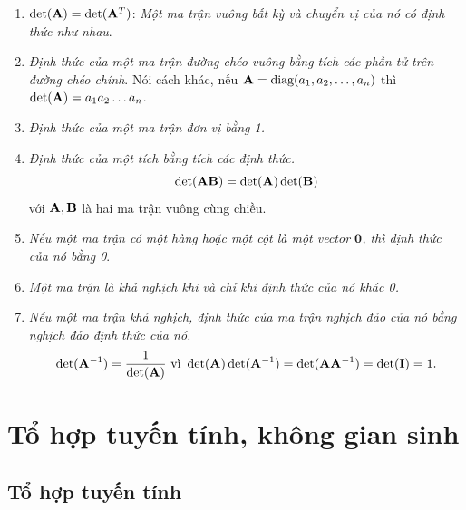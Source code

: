 \begin{enumerate}

\item $\det(\mathbf{A}) = \det(\mathbf{A}^T)$: \textit{Một ma trận vuông bất kỳ và chuyển vị của
nó có định thức như nhau}.

\item \textit{Định thức của một ma trận đường chéo vuông bằng tích các
phần tử trên đường chéo chính}. Nói cách khác, nếu $\mathbf{A} = \text{diag}(a_1, a_2, \dots, a_n)$
thì $\det(\mathbf{A}) = a_1a_2\dots a_n$.

\item \textit{Định thức của một ma trận đơn vị bằng 1.}

\item \textit{Định thức của một tích bằng tích các định thức.}
\begin{equation}
\det(\mathbf{A}\mathbf{B}) = \det(\mathbf{A}) \det(\mathbf{B})
\end{equation}
với $\mathbf{A}, \mathbf{B}$ là hai ma trận vuông cùng chiều.


\item \textit{Nếu một ma trận có một hàng hoặc một cột là một vector
$\mathbf{0}$, thì định thức của nó bằng 0}.


\item \textit{Một ma trận là khả nghịch khi và chỉ khi định thức của nó
khác 0.}


\item \textit{Nếu một ma trận khả nghịch, định thức của ma trận nghịch đảo
của nó bằng nghịch đảo định thức của nó.}
\begin{equation}
\det(\mathbf{A}^{-1})    = \frac{1}{\det(\mathbf{A})} ~\text{vì}~ \det(\mathbf{A}) \det(\mathbf{A}^
{-1}) = \det(\mathbf{A} \mathbf{A}^{-1}) = \det(\mathbf{I}) = 1.
\end{equation}



\end{enumerate}




\section{Tổ hợp tuyến tính, không gian sinh} %
\label{sec:to_hop_tuyen_tinh_khong_gian_sinh}

\subsection{Tổ hợp tuyến tính} %
\label{sub:to_hop_tuyen_tinh}

